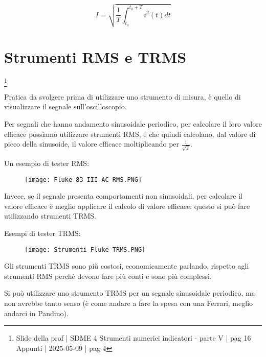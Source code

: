 {
    \Large 
    \begin{equation}
        I 
        = 
        \sqrt
        {
            \frac{1}{T}
            \int_{t_0}^{t_0 + T} 
            i^{2} (t) dt
        }
    \end{equation}
}

\newpage

\section{Strumenti RMS e TRMS}
\footnote{Slide della prof | SDME 4 Strumenti numerici indicatori - parte V | pag 16\\  
Appunti | 2025-05-09 | pag 4} 

Pratica da svolgere prima di utilizzare uno strumento di misura, è quello di visualizzare il segnale sull'oscilloscopio. \newline 

Per segnali che hanno andamento sinusoidale periodico, per calcolare il loro valore efficace possiamo utilizzare strumenti RMS, 
e che quindi calcolano, dal valore di picco della sinusoide, il valore efficace moltiplicando per $\frac{1}{\sqrt{2}}$. \newline 

Un esempio di tester RMS: 

\begin{figure}[h]
    \centering
    \texttt{[image: Fluke 83 III AC RMS.PNG]}
\end{figure}

Invece, se il segnale presenta comportamenti non sinusoidali, per calcolare il valore efficace è meglio applicare il calcolo di valore efficace: 
questo si può fare utilizzando strumenti TRMS. \newline 

Esempi di tester TRMS: 

\begin{figure}[h]
    \centering
    \texttt{[image: Strumenti Fluke TRMS.PNG]}
\end{figure}

Gli strumenti TRMS sono più costosi, economicamente parlando, rispetto agli strumenti RMS perchè devono fare più conti e sono più complessi. \newline 

Si può utilizzare uno strumento TRMS per un segnale sinusoidale periodico, ma non avrebbe tanto senso (è come andare a fare la spesa con una Ferrari, meglio andarci in Pandino). \newline

